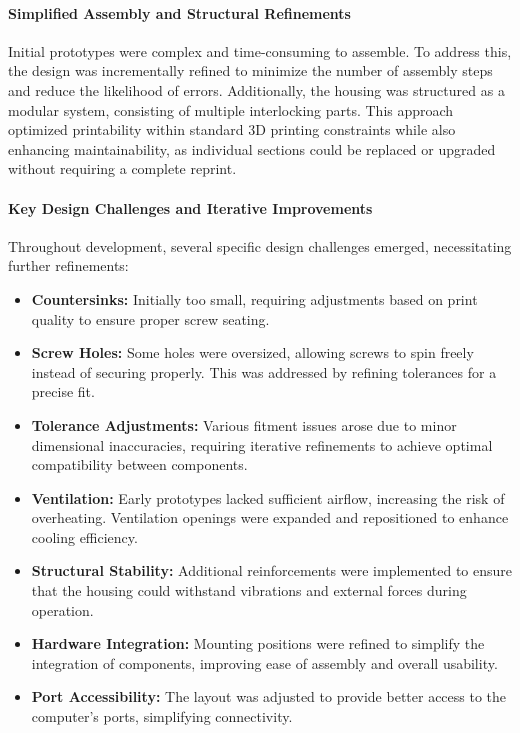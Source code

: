 \paragraph{Simplified Assembly and Structural Refinements}  
Initial prototypes were complex and time-consuming to assemble. To address this, the design was incrementally refined to minimize the number of assembly steps and reduce the likelihood of errors. Additionally, the housing was structured as a modular system, consisting of multiple interlocking parts. This approach optimized printability within standard 3D printing constraints while also enhancing maintainability, as individual sections could be replaced or upgraded without requiring a complete reprint.  

\paragraph{Key Design Challenges and Iterative Improvements}  
Throughout development, several specific design challenges emerged, necessitating further refinements:  
\begin{itemize}  
	\item \textbf{Countersinks:} Initially too small, requiring adjustments based on print quality to ensure proper screw seating.  
	\item \textbf{Screw Holes:} Some holes were oversized, allowing screws to spin freely instead of securing properly. This was addressed by refining tolerances for a precise fit.  
	\item \textbf{Tolerance Adjustments:} Various fitment issues arose due to minor dimensional inaccuracies, requiring iterative refinements to achieve optimal compatibility between components.  
	\item \textbf{Ventilation:} Early prototypes lacked sufficient airflow, increasing the risk of overheating. Ventilation openings were expanded and repositioned to enhance cooling efficiency.  
	\item \textbf{Structural Stability:} Additional reinforcements were implemented to ensure that the housing could withstand vibrations and external forces during operation.  
	\item \textbf{Hardware Integration:} Mounting positions were refined to simplify the integration of components, improving ease of assembly and overall usability.  
	\item \textbf{Port Accessibility:} The layout was adjusted to provide better access to the computer’s ports, simplifying connectivity.  
\end{itemize}  

